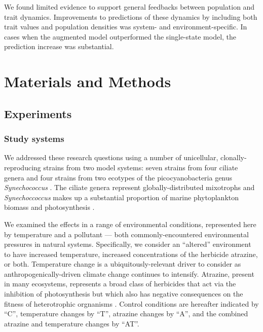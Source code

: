\documentclass{article}
\begin{document}

We found limited evidence to support general feedbacks between population and trait dynamics. Improvements to predictions of these dynamics by including both trait values and population densities was system- and environment-specific. In cases when the augmented model outperformed the single-state model, the prediction increase was substantial. 

\section{Materials and Methods}

\subsection{Experiments}

\subsubsection{Study systems}

We addressed these research questions using a number of unicellular, clonally-reproducing strains from two model systems: seven strains from four ciliate genera and four strains from two ecotypes of the picocyanobacteria genus \textit{Synechococcus} \cite{Farrant2016, Grebert2018, Sohm2016}. The ciliate genera represent globally-distributed mixotrophs \cite{Weisse2022,Lu2021} and \textit{Synechoccoccus} makes up a substantial proportion of marine phytoplankton biomass and photosynthesis \cite{Dvorak2014}.

We examined the effects in a range of environmental conditions, represented here by temperature and a pollutant --- both commonly-encountered environmental pressures in natural systems. Specifically, we consider an ``altered'' environment to have increased temperature, increased concentrations of the herbicide atrazine, or both. Temperature change is a ubiquitously-relevant driver to consider as anthropogenically-driven climate change continues to intensify. Atrazine, present in many ecosystems, represents a broad class of herbicides that act via the inhibition of photosynthesis but which also has negative consequences on the fitness of heterotrophic orgnanisms \cite{Shim2022}. Control conditions are hereafter indicated by ``C'', temperature changes by ``T'', atrazine changes by ``A'', and the combined atrazine and temperature changes by ``AT''.
\end{document}
